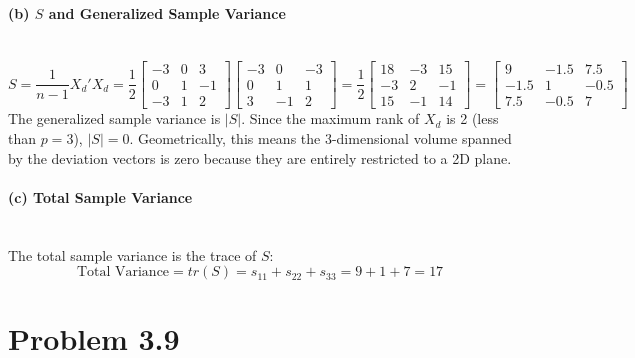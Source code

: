 \documentclass[12pt]{article}
\begin{document}
\paragraph{(b) $S$ and Generalized Sample Variance} \mbox{} \\
\[
S = \frac{1}{n-1} X_d' X_d = \frac{1}{2} \begin{bmatrix} -3 & 0 & 3 \\ 0 & 1 & -1 \\ -3 & 1 & 2 \end{bmatrix} \begin{bmatrix} -3 & 0 & -3 \\ 0 & 1 & 1 \\ 3 & -1 & 2 \end{bmatrix} = \frac{1}{2} \begin{bmatrix} 18 & -3 & 15 \\ -3 & 2 & -1 \\ 15 & -1 & 14 \end{bmatrix} = \begin{bmatrix} 9 & -1.5 & 7.5 \\ -1.5 & 1 & -0.5 \\ 7.5 & -0.5 & 7 \end{bmatrix}
\]
The generalized sample variance is $|S|$. Since the maximum rank of $X_d$ is 2 (less than $p=3$), $|S| = 0$. Geometrically, this means the $3$-dimensional volume spanned by the deviation vectors is zero because they are entirely restricted to a 2D plane.

\paragraph{(c) Total Sample Variance} \mbox{} \\
The total sample variance is the trace of $S$:
\[
\text{Total Variance} = tr(S) = s_{11} + s_{22} + s_{33} = 9 + 1 + 7 = 17
\]

\section*{Problem 3.9} 
\end{document}
